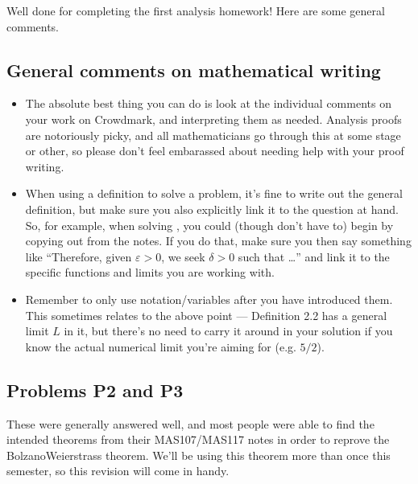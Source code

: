 \documentclass[letterpaper,10pt,english]{jupyterBook}
\begin{document}
\sphinxAtStartPar
Well done for completing the first analysis homework! Here are some general comments.


\subsection{General comments on mathematical writing}
\label{\detokenize{HW-feedback:general-comments-on-mathematical-writing}}\begin{itemize}
\item {} 
\sphinxAtStartPar
The absolute best thing you can do is look at the individual comments on your work on Crowdmark, and  interpreting them as needed. Analysis proofs are notoriously picky, and all mathematicians go through this at some stage or other, so please don’t feel embarassed about needing help with your proof writing.

\item {} 
\sphinxAtStartPar
When using a definition to solve a problem, it’s fine to write out the general definition, but make sure you also explicitly link it to the question at hand. So, for example, when solving {\hyperref[\detokenize{Problems:id3}]{}}, you could (though don’t have to) begin by copying out  from the notes. If you do that, make sure you then say something like “Therefore, given \(\varepsilon>0\), we seek \(\delta>0\) such that …” and link it to the specific functions and limits you are working with.

\item {} 
\sphinxAtStartPar
Remember to only use notation/variables after you have introduced them. This sometimes relates to the above point — Definition 2.2 has a general limit \(L\) in it, but there’s no need to carry it around in your solution if you know the actual numerical limit you’re aiming for (e.g. \(5/2\)).

\end{itemize}


\subsection{Problems P2 and P3}
\label{\detokenize{HW-feedback:problems-p2-and-p3}}
\sphinxAtStartPar
These were generally answered well, and most people were able to find the intended theorems from their MAS107/MAS117 notes in order to re\sphinxhyphen{}prove the Bolzano\sphinxhyphen{}Weierstrass theorem. We’ll be using this theorem more than once this semester, so this revision will come in handy.
\end{document}

